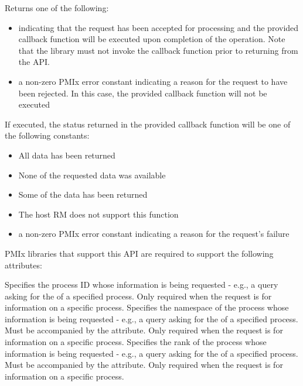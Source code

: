 Returns one of the following:

\begin{itemize}
\item {} indicating that the request has been accepted for processing and the provided callback function will be executed upon completion of the operation. Note that the library must not invoke the callback function prior to returning from the \ac{API}.
\item a non-zero \ac{PMIx} error constant indicating a reason for the request to have been rejected. In this case, the provided callback function will not be executed
\end{itemize}

If executed, the status returned in the provided callback function will be one of the following constants:

\begin{itemize}
\item {} All data has been returned
\item {} None of the requested data was available
\item {} Some of the data has been returned
\item {} The host \ac{RM} does not support this function
\item a non-zero \ac{PMIx} error constant indicating a reason for the request's failure
\end{itemize}

\reqattrstart
\ac{PMIx} libraries that support this \ac{API} are required to support the following attributes:

 Specifies the process ID whose information is being requested - e.g., a query asking for the  of a specified process. Only required when the request is for information on a specific process.
\pastePRIAttributeItemEnd
{} Specifies the namespace of the process whose information is being requested - e.g., a query asking for the  of a specified process. Must be accompanied by the  attribute. Only required when the request is for information on a specific process.
\pastePRIAttributeItemEnd
{} Specifies the rank of the process whose information is being requested - e.g., a query asking for the  of a specified process. Must be accompanied by the  attribute. Only required when the request is for information on a specific process.
\pastePRIAttributeItemEnd
{}

